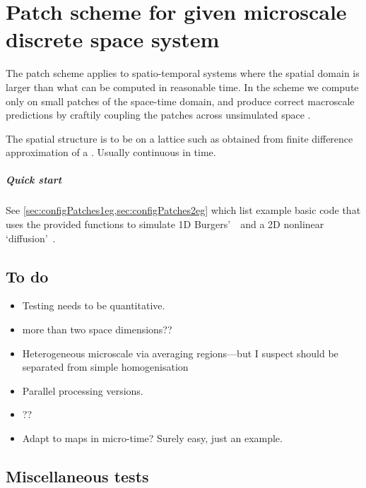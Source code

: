 \chapter{Patch scheme for given microscale discrete space system}
\label{sec:patch}
\localtableofcontents

The patch scheme applies to spatio-temporal systems where
the spatial domain is larger than what can be computed in
reasonable time.  In the scheme we compute only on small patches
of the space-time domain, and produce correct macroscale
predictions by craftily coupling the patches across
unsimulated space \cite[e.g.]{Hyman2005, Samaey03b,
Samaey04, Roberts06d, Liu2015}.

The spatial structure is to be on a lattice such as obtained
from finite difference approximation of a \pde. Usually
continuous in time.

\paragraph{Quick start}
See \cref{sec:configPatches1eg,sec:configPatches2eg} which
list example basic code that uses the provided functions to
simulate 1D Burgers'~\pde\ and a 2D nonlinear
`diffusion'~\pde.




\begin{devMan}



\end{devMan}




\begin{devMan}




\section{To do}
\begin{itemize}
\item Testing needs to be quantitative.
\item more than two space dimensions??
\item Heterogeneous microscale via averaging regions---but I suspect should be separated from simple homogenisation
\item Parallel processing versions.
\item ??
\item Adapt to maps in micro-time?  Surely easy, just an example.
\end{itemize}


\section{Miscellaneous tests}



\end{devMan}

